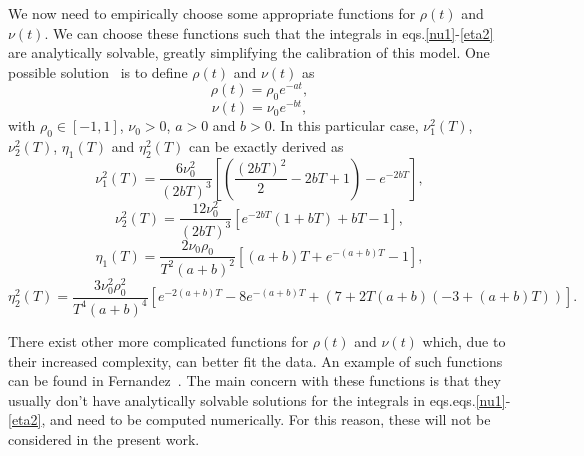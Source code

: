 We now need to empirically choose some appropriate functions for $\rho(t)$ and $\nu(t)$.
We can choose these functions such that the integrals in eqs.\eqref{nu1}-\eqref{eta2} are analytically  solvable, greatly simplifying the calibration of this model.
One possible solution~\citep{Fernandez} is to define $\rho(t)$ and $\nu(t)$ as
\begin{equation}\label{rhot}
\rho(t)=\rho_0e^{-at},
\end{equation}
\begin{equation}\label{nut}
\nu(t)=\nu_0e^{-bt},
\end{equation}
\noindent with $\rho_0\in[-1,1]$, $\nu_0>0$, $a>0$ and $b>0$.
In this particular case, $\nu_1^2(T)$, $\nu_2^2(T)$, $\eta_1(T)$ and $\eta_2^2(T)$ can be exactly derived as
\begin{equation}
\nu_1^2(T)=\frac{6\nu_0^2}{(2bT)^3}\left[\left(\frac{(2bT)^2}{2}-2bT+1\right)-e^{-2bT}\right],
\end{equation}
\begin{equation}
\nu_2^2(T)=\frac{12\nu_0^2}{(2bT)^3}\left[e^{-2bT}(1+bT)+bT-1\right],
\end{equation}
\begin{equation}
\eta_1(T)=\frac{2\nu_0\rho_0}{T^2(a+b)^2}\left[(a+b)T+e^{-(a+b)T}-1\right],
\end{equation}
\begin{equation}
\eta_2^2(T)=\frac{3\nu_0^2\rho_0^2}{T^4(a+b)^4}\left[e^{-2(a+b)T}-8e^{-(a+b)T}+(7+2T(a+b)(-3+(a+b)T))\right].
\end{equation}

There exist other more complicated functions for $\rho(t)$ and $\nu(t)$ which, due to their increased complexity, can better fit the data. An example of such functions can be found in Fernandez~\citep{Fernandez}. The main concern with these functions is that they usually don't have analytically solvable solutions for the integrals in eqs.eqs.\eqref{nu1}-\eqref{eta2}, and need to be computed numerically. For this reason, these will not be considered in the present work.
